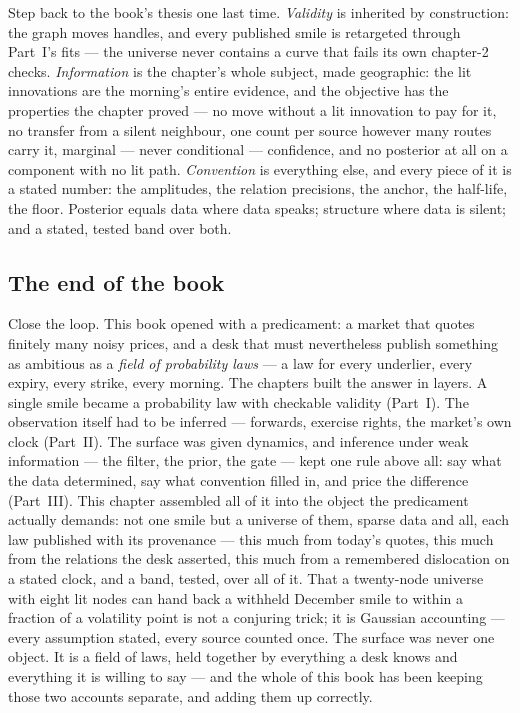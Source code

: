 Step back to the book's thesis one last time.
\emph{Validity} is inherited by construction: the graph moves handles,
and every published smile is retargeted through Part~I's fits ---
the universe never contains a curve that fails its own chapter-2
checks.  \emph{Information} is the chapter's whole subject, made
geographic: the lit innovations are the morning's entire evidence, and
the objective has the properties the chapter proved --- no move
without a lit innovation to pay for it, no transfer from a silent
neighbour, one count per source however many routes carry it,
marginal --- never conditional --- confidence, and no posterior at all
on a component with no lit path.  \emph{Convention} is everything
else, and every piece of
it is a stated number: the amplitudes, the relation
precisions, the anchor, the half-life, the floor.  Posterior equals
data where data speaks; structure where data is silent; and a
stated, tested band over both.

\subsection{The end of the book}

Close the loop.  This book opened with a predicament: a market that
quotes finitely many noisy prices, and a desk that must nevertheless
publish something as ambitious as a \emph{field of probability laws}
--- a law for every underlier, every expiry, every strike, every
morning.  The chapters built the answer in layers.  A single smile
became a probability law with checkable validity (Part~I).  The
observation itself had to be inferred --- forwards, exercise rights,
the market's own clock (Part~II).  The surface was given dynamics,
and inference under weak information --- the filter, the prior, the
gate --- kept one rule above all: say what the data determined,
say what convention filled in, and price the difference
(Part~III).  This chapter assembled all of it into the object the
predicament actually demands: not one smile but a universe of them,
sparse data and all, each law published with its provenance --- this
much from today's quotes, this much from the relations the desk
asserted, this much from a remembered dislocation on a
stated clock, and a band, tested, over all of it.  That a
twenty-node universe with eight lit nodes can hand back a withheld
December smile to within a fraction of a volatility point is not a
conjuring trick; it is Gaussian accounting --- every assumption
stated, every source counted once.  The surface was never one object.
It is a field of laws, held together by everything a desk knows and
everything it is willing to say --- and the whole of this book has
been keeping those two accounts separate, and
adding them up correctly.
